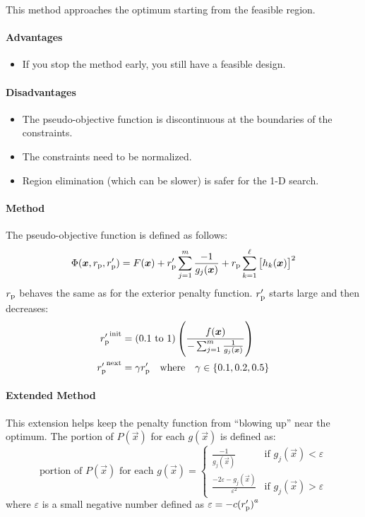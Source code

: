\documentclass{article}
\begin{document}
This method approaches the optimum starting from the feasible region.

\paragraph{Advantages}
\begin{itemize}
\item If you stop the method early, you still have a feasible design.
\end{itemize}

\paragraph{Disadvantages}
\begin{itemize}
\item The pseudo-objective function is discontinuous at the boundaries of the constraints.
\item The constraints need to be normalized.
\item Region elimination (which can be slower) is safer for the 1-D search.
\end{itemize}

\paragraph{Method}
The pseudo-objective function is defined as follows:
\[\Phi(\bm{x}, r_{\mathrm{p}}, r'_{\mathrm{p}})
= F(\bm{x}) + r'_{\mathrm{p}} \sum_{j=1}^m{\frac{-1}{g_j(\bm{x})}}
+ r_{\mathrm{p}} \sum_{k=1}^\ell{\left[h_k(\bm{x})\right]}^2\]
\(r_{\mathrm{p}}\) behaves the same as for the exterior penalty function. \(r'_{\mathrm{p}}\) starts large and then decreases:
\begin{align*}
  {r'_{\mathrm{p}}}^\textrm{init} &= (0.1 \textrm{ to } 1) \left(\frac{f(\bm{x})}{-\sum_{j=1}^m{\frac{1}{g_j(\bm{x})}}}\right) \\
  {r'_{\mathrm{p}}}^\textrm{next} &= \gamma r'_{\mathrm{p}} \quad \textrm{where} \quad \gamma \in \{0.1, 0.2, 0.5\}
\end{align*}

\paragraph{Extended Method}
This extension helps keep the penalty function from ``blowing up'' near the optimum. The portion
of \(P(\vec{x})\) for each \(g(\vec{x})\) is defined as:
\[\textrm{portion of } P(\vec{x}) \textrm{ for each } g(\vec{x}) =
\begin{cases}
  \frac{-1}{g_j(\vec{x})} & \textrm{if } g_j(\vec{x}) < \varepsilon \\
  \frac{-2\varepsilon - g_j(\vec{x})}{\varepsilon^2} & \textrm{if } g_j(\vec{x}) > \varepsilon
\end{cases}\] where \(\varepsilon\) is a small negative number defined as
\(\varepsilon = -c {(r'_{\mathrm{p}})}^a\)
\end{document}
